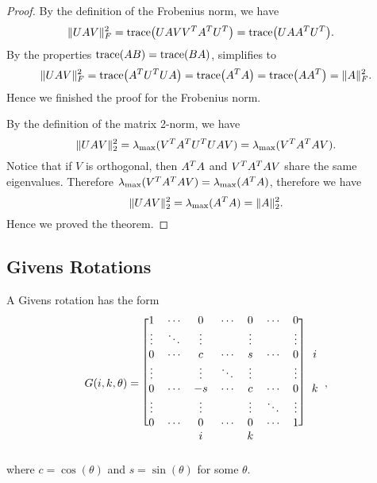 \begin{proof}
By the definition of the Frobenius norm, we have 
  \begin{equation}
      \label{eq:thm2-2-proof1}
      \begin{aligned}
          \|UAV\|_F^2 &= \mathrm{trace}\big(U AVV^T A^T U^T \big) = \mathrm{trace}\big( U AA^T U^T\big).
      \end{aligned}
  \end{equation}
  By the properties $\mathrm{trace}(AB) = \mathrm{trace}(BA)$,  simplifies to 
  \begin{equation}
      \label{eq:thm2-2-proof2}
      \|U AV\|_F^2 = \mathrm{trace}\big(A^T U^T U A\big) = \mathrm{trace}\big(A^T A\big) = \mathrm{trace}\big(AA^T\big) = \|A\|_F^2.
  \end{equation}
  Hence we finished the proof for the Frobenius norm.

  By the definition of the matrix 2-norm, we have 
  \begin{equation}\notag
    \|{UAV}\|_2^2 = \lambda_{\max}(V^T A^T U^T UAV) = \lambda_{\max}({V^T A^T AV}).
  \end{equation}
  Notice that if $V$ is orthogonal, then $A^T A$ and $V^T A^T A V$ share the same eigenvalues. Therefore $\lambda_{\max}(V^T A^T AV) = \lambda_{\max} (A^T A)$, therefore we have 
  \begin{equation}\notag
    \|{UAV}\|_2^2 = \lambda_{\max}(A^T A) = \|{A}\|_2^2.
  \end{equation}
  Hence we proved the theorem.
\end{proof}

\subsection{Givens Rotations}\label{sec:givens-rotation}

\begin{definition}
  A Givens rotation has the form 
  \begin{equation}\label{eq:givens}
      G(i, k, \theta)=
      \begin{blockarray}{cccccccc}
      \begin{block}{[ccccccc]c}
          1 & \cdots & 0 & \cdots & 0 & \cdots & 0 &  \\
          \vdots & \ddots & \vdots & & \vdots & & \vdots& \\
          0 & \cdots & c & \cdots & s & \cdots & 0 & i\\
          \vdots & & \vdots & \ddots & \vdots & & \vdots &  \\
          0 & \cdots & -s & \cdots & c & \cdots & 0 & k\\
          \vdots & & \vdots & & \vdots & \ddots & \vdots & \\
          0 & \cdots & 0 & \cdots & 0 & \cdots & 1 & \\
      \end{block}
       &  & i &  & k &  &  \\
      \end{blockarray},
  \end{equation}
  where $c = \cos(\theta)$ and $s = \sin(\theta)$ for some $\theta$.
\end{definition}

